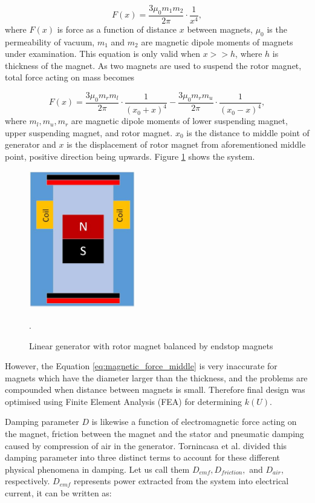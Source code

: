\begin{equation}\label{eq:magnetic_force}
  F(x) = \frac{3 \mu_0 m_1 m_2}{2 \pi} \cdot \frac{1}{x^4},
\end{equation}
where $F(x)$ is force as a function of distance $x$ between magnets, $\mu_0$ is the permeability of vacuum, $ m_1 $ and $ m_2 $ are magnetic dipole moments of magnets under examination. This equation is only valid when $x >> h$, where $h$ is thickness of the magnet. As two magnets are used to suspend the rotor magnet, total force acting on mass becomes 

\begin{equation}\label{eq:magnetic_force_middle}
  F(x) = \frac{3 \mu_0 m_r m_l}{2 \pi} \cdot \frac{1}{(x_0+x)^4} - \frac{3 \mu_0 m_r m_u}{2 \pi} \cdot \frac{1}{(x_0-x)^4},
\end{equation}
where $m_l, m_u, m_r$ are magnetic dipole moments of lower suspending magnet, upper suspending magnet, and rotor magnet. $x_0$ is the distance to middle point of generator and $x$ is the displacement of rotor magnet from aforementioned middle point, positive direction being upwards. Figure \ref{fig:lg} shows the system.

\begin{figure}[htb]
\begin{center}
\includegraphics[height=6cm]{images/own_dwg/generator}
\end{center}
\caption{Linear generator with rotor magnet balanced by endstop magnets}.
\label{fig:lg}
\end{figure}

However, the Equation \eqref{eq:magnetic_force_middle} is very inaccurate for magnets which have the diameter larger than the thickness, and the problems are compounded when distance between magnets is small. Therefore final design was optimised using Finite Element Analysis (FEA) for determining $k(U)$. 

Damping parameter $D$ is likewise a function of electromagnetic force acting on the magnet, friction between the magnet and the stator and pneumatic damping caused by compression of air in the generator. Tornincasa et al. \cite{Tornincasa2012} divided this damping parameter into three distinct terms to account for these different physical phenomena in damping. Let us call them $D_{emf}, D_{friction},$ and $D_{air}$, respectively. $D_{emf}$ represents power extracted from the system into electrical current, it can be written as:


